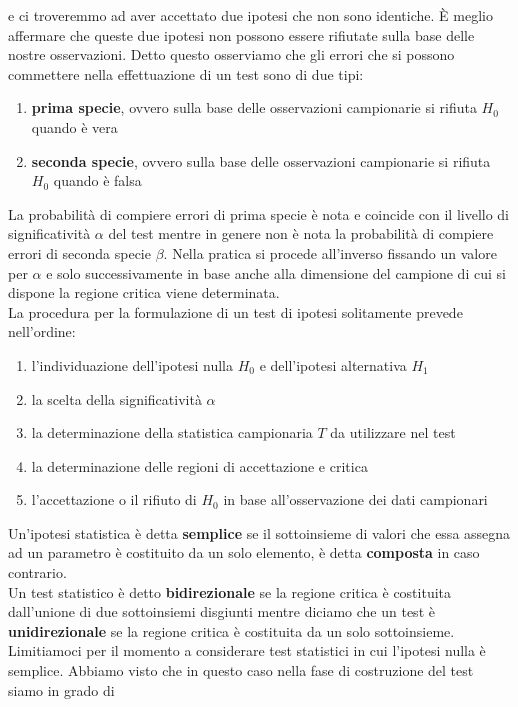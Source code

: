 \documentclass[a4paper,12pt, oneside]{book}
\begin{document}
e ci troveremmo ad aver accettato due ipotesi che non sono identiche.
È meglio affermare che queste due ipotesi non possono essere rifiutate sulla base
delle nostre osservazioni.
\newpage
Detto questo osserviamo che gli errori che si possono commettere nella effettuazione
di un test sono di due tipi:
\begin{enumerate}
\item \textbf{prima specie}, ovvero sulla base delle osservazioni campionarie si rifiuta $H_0$ quando è vera
\item \textbf{seconda specie}, ovvero sulla base delle osservazioni campionarie si rifiuta $H_0$ quando è falsa 
\end{enumerate}
La probabilità di compiere errori di prima specie è nota e coincide con il livello di
significatività $\alpha$ del test mentre in genere non è nota la probabilità di compiere
errori di seconda specie $\beta$. Nella pratica si procede all’inverso fissando un valore per $\alpha$ e solo successivamente
in base anche alla dimensione del campione di cui si dispone la regione critica viene determinata.\\
La procedura per la formulazione di un test di ipotesi solitamente prevede nell’ordine:
\begin{enumerate}
\item l'individuazione dell’ipotesi nulla $H_0$ e dell’ipotesi alternativa $H_1$
\item la scelta della significatività $\alpha$
\item la determinazione della statistica campionaria $T$ da utilizzare nel test
\item la determinazione delle regioni di accettazione e critica
\item l'accettazione o il rifiuto di $H_0$ in base all’osservazione dei dati campionari
\end{enumerate}
Un’ipotesi statistica è detta \textbf{semplice} se il sottoinsieme di valori che essa assegna
ad un parametro è costituito da un solo elemento, è detta \textbf{composta} in caso contrario.\\
Un test statistico è detto \textbf{bidirezionale} se la regione critica è costituita
dall’unione di due sottoinsiemi disgiunti mentre diciamo che un test è
\textbf{unidirezionale} se la regione critica è costituita da un solo sottoinsieme.\\
Limitiamoci per il momento a considerare test statistici in cui l’ipotesi nulla è
semplice.
Abbiamo visto che in questo caso nella fase di costruzione del test siamo in grado di
\end{document}
